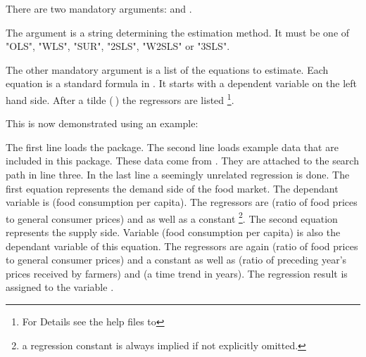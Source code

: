 \documentclass[article]{jss}
\begin{document}
There are two mandatory arguments:  and .

The argument  is a string determining the estimation method.
It must be one of "OLS", "WLS", "SUR", "2SLS", "W2SLS" or "3SLS".

The other mandatory argument  is a list of the equations 
to estimate. 
Each equation is a standard formula in .
It starts with a dependent variable on the left hand side.
After a tilde ($~$) the regressors are listed%
\footnote{For Details see the  help files to }.

This is now demonstrated using an example: \\

The first line loads the  package. 
The second line loads example data that are included in this package.
These data come from \cite{kmenta86}.
They are attached to the  search path in line three.
In the last line a seemingly unrelated regression is done.
The first equation represents the demand side of the food market.
The dependant variable is  (food consumption per capita). 
The regressors are  (ratio of food prices to general consumer prices)
and  as well as a constant%
\footnote{a regression constant is always implied if not explicitly omitted.}.
The second equation represents the supply side.
Variable  (food consumption per capita) is also the dependant 
variable of this equation. 
The regressors are again  (ratio of food prices to general 
consumer prices) and a constant as well as 
 (ratio of preceding year's prices received by farmers) and 
 (a time trend in years).
The regression result is assigned to the variable .
\end{document}
